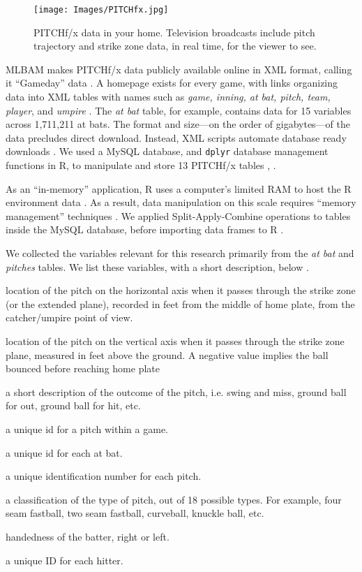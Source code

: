         \begin{figure}[H]
      	\centering
      	\texttt{[image: Images/PITCHfx.jpg]} 
      	\caption{PITCHf/x\textsuperscript{\textregistered} data in your home. Television broadcasts include pitch trajectory and strike zone data, in real time, for the viewer to see.}
      	\label{fig:fx1}
      	\end{figure} 
MLBAM\textsuperscript{\textregistered} makes PITCHf/x\textsuperscript{\textregistered} data publicly available online in XML format, calling it ``Gameday'' data \citep{Sievert2014}. A homepage exists for every game, with links organizing data into XML tables with names such as {\it game, inning, at bat, pitch, team, player}, and {\it umpire} \citep{Sievert2014}. The {\it at bat} table, for example, contains data for 15 variables across 1,711,211 at bats. The format and size---on the order of gigabytes---of the data precludes direct download. Instead, XML scripts automate database ready downloads \citep{Adler2006}. We used a MySQL database, and \verb|dplyr| database management functions in R, to manipulate and store 13 PITCHf/x\textsuperscript{\textregistered} tables \citep{Tahaghoghi2006}, \citep{Wickham2016}. 

As an ``in-memory'' application, R uses a computer's limited RAM to host the R environment data \citep{Smith2013}. As a result, data manipulation on this scale requires ``memory management'' techniques \citep{Wickham2014}.  We applied Split-Apply-Combine operations to tables inside the MySQL database, before importing data frames to R \citep{Wickham2011}.

We collected the variables relevant for this research primarily from the {\it at bat} and {\it pitches} tables. We list these variables, with a short description, below \citep{Fast2007}.
  \begin{description}[leftmargin=1.5cm, style=nextline]
  \item[px] location of the pitch on the horizontal axis when it passes through the strike zone (or the extended plane), recorded in feet from the middle of home plate, from the catcher/umpire point of view.
  \item[pz] location of the pitch on the vertical axis when it passes through the strike zone plane, measured in feet above the ground. A negative value implies the ball bounced before reaching home plate
  \item[des] a short description of the outcome of the pitch, i.e. swing and miss, ground ball for out, ground ball for hit, etc.
  \item[id] a unique id for a pitch within a game.
  \item[ab\_id] a unique id for each at bat.
  \item[pitch\_id] a unique identification number for each pitch.
  \item[pitch\_type] a classification of the type of pitch, out of 18 possible types. For example, four seam fastball, two seam fastball, curveball, knuckle ball, etc.
  \item[stand] handedness of the batter, right or left.
  \item[batter] a unique ID for each hitter.
\end{description}

